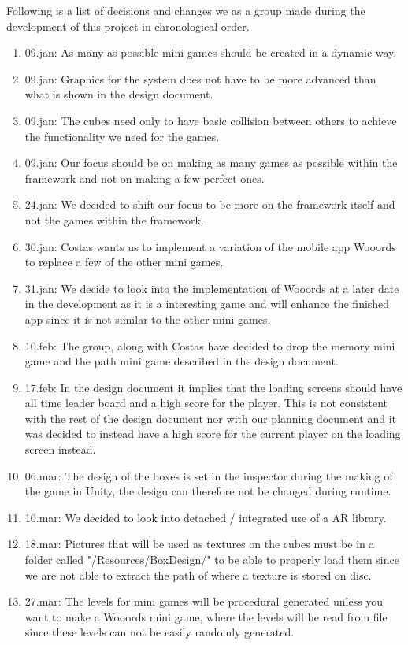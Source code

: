 Following is a list of decisions and changes we as a group made during the development of this project in chronological order.

\begin{enumerate}
	\item 09.jan: As many as possible mini games should be created in a dynamic way.
	\item 09.jan: Graphics for the system does not have to be more advanced than what is shown in the design document.
	\item 09.jan: The cubes need only to have basic collision between others to achieve the functionality we need for the games.
	\item 09.jan: Our focus should be on making as many games as possible within the framework and not on making  a few perfect ones.
	\item 24.jan: We decided to shift our focus to be more on the framework itself and not the games within the framework.
	\item 30.jan: Costas wants us to implement a variation of the mobile app Wooords to replace a few of the other mini games.
	\item 31.jan: We decide to look into the implementation of Wooords at a later date in the development as it is a interesting game and will enhance the finished app since it is not similar to the other mini games.
	\item 10.feb: The group, along with Costas have decided to drop the memory mini game and the path mini game described in the design document.
	\item 17.feb: In the design document it implies that the loading screens should have all time leader board and a high score for the player. This is not consistent with the rest of the design document nor with our planning document and it was decided to instead have a high score for the current player on the loading screen instead.
	\item 06.mar: The design of the boxes is set in the inspector during the making of the game in Unity, the design can therefore not be changed during runtime.
	\item 10.mar: We decided to look into detached / integrated use of a AR library.
	\item 18.mar: Pictures that will be used as textures on the cubes must be in a folder called "/Resources/BoxDesign/" to be able to properly load them since we are not able to extract the path of where a texture is stored on disc.
	\item 27.mar: The levels for mini games will be procedural generated unless you want to make a Wooords mini game, where the levels will be read from file since these levels can not be easily randomly generated.
\end{enumerate}

